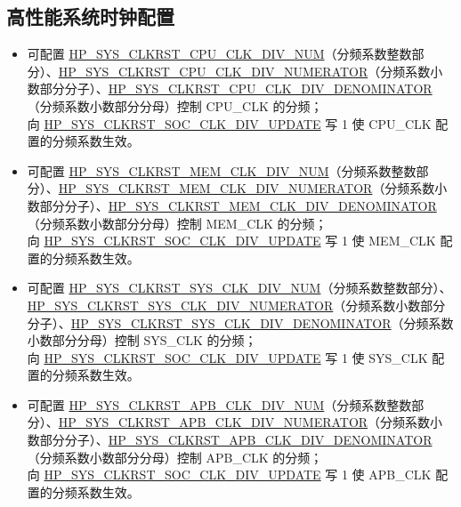\documentclass[main\_\_CN.tex]{subfiles}
\begin{document}
\subsection{高性能系统时钟配置}

\begin{itemize}

\item 可配置 \hyperref[fielddesc:HPSYSCLKRSTCPUCLKDIVNUM]{HP\_SYS\_CLKRST\_CPU\_CLK\_DIV\_NUM}（分频系数整数部分）、\hyperref[fielddesc:HPSYSCLKRSTCPUCLKDIVNUMERATOR]{HP\_SYS\_CLKRST\_CPU\_CLK\_DIV\_NUMERATOR}（分频系数小数部分分子）、\hyperref[fielddesc:HPSYSCLKRSTCPUCLKDIVDENOMINATOR]{HP\_SYS\_CLKRST\_CPU\_CLK\_DIV\_DENOMINATOR}（分频系数小数部分分母）控制 CPU\_CLK 的分频；\\
向 \hyperref[fielddesc:HPSYSCLKRSTSOCCLKDIVUPDATE]{HP\_SYS\_CLKRST\_SOC\_CLK\_DIV\_UPDATE} 写 1 使 CPU\_CLK 配置的分频系数生效。

\item 可配置 \hyperref[fielddesc:HPSYSCLKRSTMEMCLKDIVNUM]{HP\_SYS\_CLKRST\_MEM\_CLK\_DIV\_NUM}（分频系数整数部分）、\hyperref[fielddesc:HPSYSCLKRSTMEMCLKDIVNUMERATOR]{HP\_SYS\_CLKRST\_MEM\_CLK\_DIV\_NUMERATOR}（分频系数小数部分分子）、\hyperref[fielddesc:HPSYSCLKRSTMEMCLKDIVDENOMINATOR]{HP\_SYS\_CLKRST\_MEM\_CLK\_DIV\_DENOMINATOR}（分频系数小数部分分母）控制 MEM\_CLK 的分频；\\
向 \hyperref[fielddesc:HPSYSCLKRSTSOCCLKDIVUPDATE]{HP\_SYS\_CLKRST\_SOC\_CLK\_DIV\_UPDATE} 写 1 使 MEM\_CLK 配置的分频系数生效。


\item 可配置 \hyperref[fielddesc:HPSYSCLKRSTSYSCLKDIVNUM]{HP\_SYS\_CLKRST\_SYS\_CLK\_DIV\_NUM}（分频系数整数部分）、\hyperref[fielddesc:HPSYSCLKRSTSYSCLKDIVNUMERATOR]{HP\_SYS\_CLKRST\_SYS\_CLK\_DIV\_NUMERATOR}（分频系数小数部分分子）、\hyperref[fielddesc:HPSYSCLKRSTSYSCLKDIVDENOMINATOR]{HP\_SYS\_CLKRST\_SYS\_CLK\_DIV\_DENOMINATOR}（分频系数小数部分分母）控制 SYS\_CLK 的分频；\\
向 \hyperref[fielddesc:HPSYSCLKRSTSOCCLKDIVUPDATE]{HP\_SYS\_CLKRST\_SOC\_CLK\_DIV\_UPDATE} 写 1 使 SYS\_CLK 配置的分频系数生效。

\item 可配置 \hyperref[fielddesc:HPSYSCLKRSTAPBCLKDIVNUM]{HP\_SYS\_CLKRST\_APB\_CLK\_DIV\_NUM}（分频系数整数部分）、\hyperref[fielddesc:HPSYSCLKRSTAPBCLKDIVNUMERATOR]{HP\_SYS\_CLKRST\_APB\_CLK\_DIV\_NUMERATOR}（分频系数小数部分分子）、\hyperref[fielddesc:HPSYSCLKRSTAPBCLKDIVDENOMINATOR]{HP\_SYS\_CLKRST\_APB\_CLK\_DIV\_DENOMINATOR}（分频系数小数部分分母）控制 APB\_CLK 的分频；\\
向 \hyperref[fielddesc:HPSYSCLKRSTSOCCLKDIVUPDATE]{HP\_SYS\_CLKRST\_SOC\_CLK\_DIV\_UPDATE} 写 1 使 APB\_CLK 配置的分频系数生效。





\end{itemize}
\end{document}
